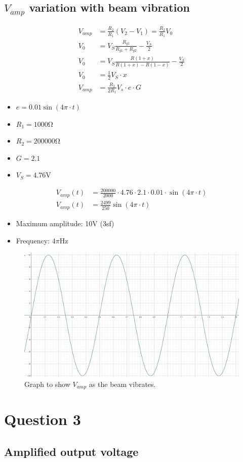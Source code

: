 \documentclass[12pt]{article}
\numberwithin{equation}{section}
\begin{document}
\subsection*{$V_{amp}$ variation with beam vibration}
\begin{align}
  V_{amp} &= \frac{R_2}{R_1} (V_2 - V_1) = \frac{R_2}{R_1} V_0\\
  V_0 &= V_S \frac{R_{g1}}{R_{g1} + R_{g2}} - \frac{V_S}{2}\\
  V_0 &= V_S \frac{R(1+x)}{R(1+x) - R(1-x)} - \frac{V_S}{2}\\
  V_0 &= \frac{1}{2}V_S \cdot x\\
  V_{amp} &= \frac{R_2}{2R_1} V_s \cdot e \cdot G
\end{align}
\begin{itemize}
  \item $e = 0.01 \sin{\left(4\pi \cdot t\right)}$
  \item $R_1 = 1000\si{\ohm}$
  \item $R_2 = 200000\si{\ohm}$
  \item $G = 2.1$
  \item $V_S = 4.76\si{\volt}$
\end{itemize}
\begin{align}
  V_{amp}(t) &= \frac{200000}{2000} \cdot 4.76 \cdot 2.1 \cdot 0.01 \cdot \sin{\left(4\pi \cdot t\right)}\\
  V_{amp}(t) &= \frac{2499}{250} \sin{\left(4\pi \cdot t\right)}
\end{align}
\begin{itemize}
  \item Maximum amplitude: 10\si{\volt} (3sf)
  \item Frequency: $4\pi \si{\hertz}$
\end{itemize}
\begin{figure}[H]
  \centering
  \includegraphics[width=\textwidth]{./img/5-2Vampresponse.png}
  \caption{Graph to show $V_{amp}$ as the beam vibrates.}
\end{figure}
\section{Question 3}
\subsection*{Amplified output voltage}
\end{document}
